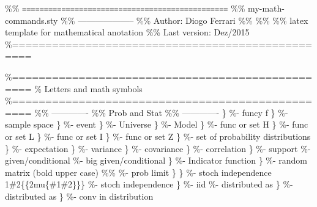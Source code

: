 \documentclass[a4paper]{article}
\author{diogo}
\date{\today}
\title{}
\begin{document}
\%\% \texttt{===============================================}
\%\% my-math-commands.sty
\%\% --------------------
\%\% Author: Diogo Ferrari
\%\%
\%\%
\%\% latex template for mathematical anotation
\%\% Last version: Dez/2015
\%=================================================


\RequirePackage{tikz}
\%=================================================
\%		Letters and math symbols
\%=================================================
\%\% -------------
\%\% Prob and Stat
\%\% -------------
\newcommand{\F}\{\}									   \%- funcy f
\newcommand{\Sa}\{\}                                      \%- sample space
\newcommand{\Ev}\{\}                                      \%- event
\newcommand{\U}\{\}									   \%- Universe
\newcommand{\M}\{\}									   \%- Model
\newcommand{\Hf}\{\}									   \%- func or set H
\newcommand{\Lf}\{\}									   \%- func or set L
\newcommand{\If}\{\}									   \%- func or set I
\newcommand{\Zf}\{\}									   \%- func or set Z
\newcommand{\Ps}\{\}									   \%- set of probability distributions
\newcommand{\E}\{\}                                        \%- expectation
\newcommand{\Var}\{\}                             \%- variance
\newcommand{\Cov}\{\}                             \%- covariance
\newcommand{\Corr}\{\}		                   \%- correlation
\newcommand{\supp}\{\}                                    \%- support 
\newcommand{\given}{\mid}                                          \%- given/conditional
\newcommand{\bgiven}{\middle\vert}                                 \%- big given/conditional
\newcommand{\I}\{\}                                        \%- Indicator function
\newcommand{\rmatr}[1]\{\}                                \%- random matrix (bold upper case)
\%\% \DeclareMathOperator*{\plim}{plim}                                 \%- prob limit
\newcommand{\plim}\{\}
\newcommand\ind\{\protect\mathpalette{\protect\independenT}{\perp}\} \%- stoch independence
\def\independenT\#1\#2\{\mathrel\{\mkern2mu\{\#1\#2\}\}\}       \%- stoch independence
\newcommand{\iid}\{\}                             \%- iid
\newcommand{\dist}{\sim}                        \%- distributed as
\newcommand{\distas}[1]\{\}                        \%- distributed as
\newcommand{\convdist}\{\}                   \%- conv in distribution
\end{document}
